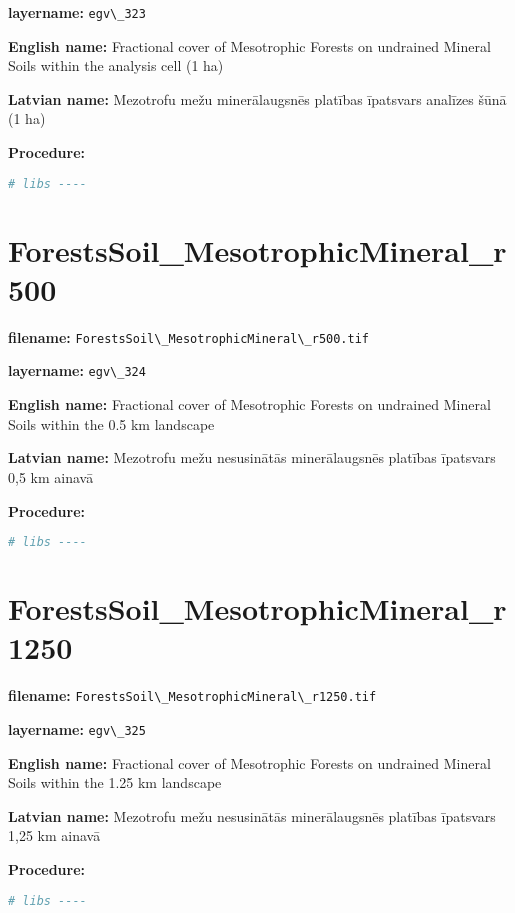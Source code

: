 \documentclass[
]{book}
\newcommand{\passthrough}[1]{#1}
\begin{document}
\textbf{layername:} \passthrough{\lstinline!egv\_323!}

\textbf{English name:} Fractional cover of Mesotrophic Forests on undrained Mineral Soils within the analysis cell (1 ha)

\textbf{Latvian name:} Mezotrofu mežu minerālaugsnēs platības īpatsvars analīzes šūnā (1 ha)

\textbf{Procedure:}

\begin{lstlisting}[language=R]
# libs ----
\end{lstlisting}

\section{ForestsSoil\_MesotrophicMineral\_r500}\label{ch06.324}

\textbf{filename:} \passthrough{\lstinline!ForestsSoil\_MesotrophicMineral\_r500.tif!}

\textbf{layername:} \passthrough{\lstinline!egv\_324!}

\textbf{English name:} Fractional cover of Mesotrophic Forests on undrained Mineral Soils within the 0.5 km landscape

\textbf{Latvian name:} Mezotrofu mežu nesusinātās minerālaugsnēs platības īpatsvars 0,5 km ainavā

\textbf{Procedure:}

\begin{lstlisting}[language=R]
# libs ----
\end{lstlisting}

\section{ForestsSoil\_MesotrophicMineral\_r1250}\label{ch06.325}

\textbf{filename:} \passthrough{\lstinline!ForestsSoil\_MesotrophicMineral\_r1250.tif!}

\textbf{layername:} \passthrough{\lstinline!egv\_325!}

\textbf{English name:} Fractional cover of Mesotrophic Forests on undrained Mineral Soils within the 1.25 km landscape

\textbf{Latvian name:} Mezotrofu mežu nesusinātās minerālaugsnēs platības īpatsvars 1,25 km ainavā

\textbf{Procedure:}

\begin{lstlisting}[language=R]
# libs ----
\end{lstlisting}
\end{document}
